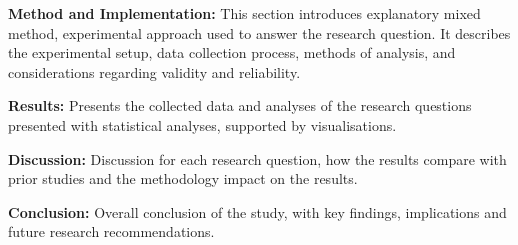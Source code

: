 \textbf{Method and Implementation:} This section introduces explanatory mixed method, experimental approach used to answer the research question. It describes the experimental setup, data collection process, methods of analysis, and considerations regarding validity and reliability.   

\textbf{Results:} Presents the collected data and analyses of the research questions presented with statistical analyses, supported by visualisations. 

\textbf{Discussion:} Discussion for each research question, how the results compare with prior studies and the methodology impact on the results. 

\textbf{Conclusion:} Overall conclusion of the study, with key findings, implications and future research recommendations.  




